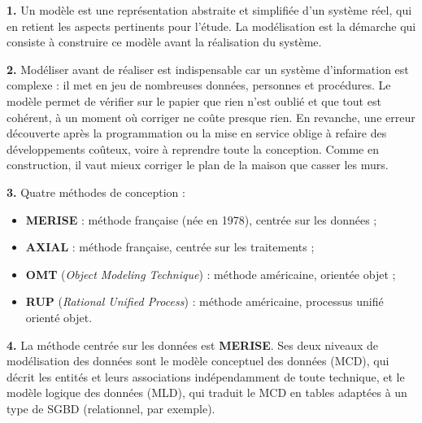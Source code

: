 \documentclass[11pt]{article}
\newcommand{\cle}[1]{{\popxbold\color{popdark}#1}}
\begin{document}
\begin{corrige}
\textbf{1.} Un \cle{modèle} est une représentation abstraite et simplifiée d'un système réel, qui en retient les aspects pertinents pour l'étude. La \cle{modélisation} est la démarche qui consiste à construire ce modèle avant la réalisation du système.

\textbf{2.} Modéliser avant de réaliser est indispensable car un système d'information est complexe : il met en jeu de nombreuses données, personnes et procédures. Le modèle permet de vérifier sur le papier que rien n'est oublié et que tout est cohérent, à un moment où corriger ne coûte presque rien. En revanche, une erreur découverte après la programmation ou la mise en service oblige à refaire des développements coûteux, voire à reprendre toute la conception. Comme en construction, il vaut mieux corriger le plan de la maison que casser les murs.

\textbf{3.} Quatre méthodes de conception :
\begin{itemize}
\item \textbf{MERISE} : méthode française (née en 1978), centrée sur les données ;
\item \textbf{AXIAL} : méthode française, centrée sur les traitements ;
\item \textbf{OMT} (\emph{Object Modeling Technique}) : méthode américaine, orientée objet ;
\item \textbf{RUP} (\emph{Rational Unified Process}) : méthode américaine, processus unifié orienté objet.
\end{itemize}

\textbf{4.} La méthode centrée sur les données est \textbf{MERISE}. Ses deux niveaux de modélisation des données sont le \cle{modèle conceptuel des données} (MCD), qui décrit les entités et leurs associations indépendamment de toute technique, et le \cle{modèle logique des données} (MLD), qui traduit le MCD en tables adaptées à un type de SGBD (relationnel, par exemple).
\end{corrige}
\end{document}
